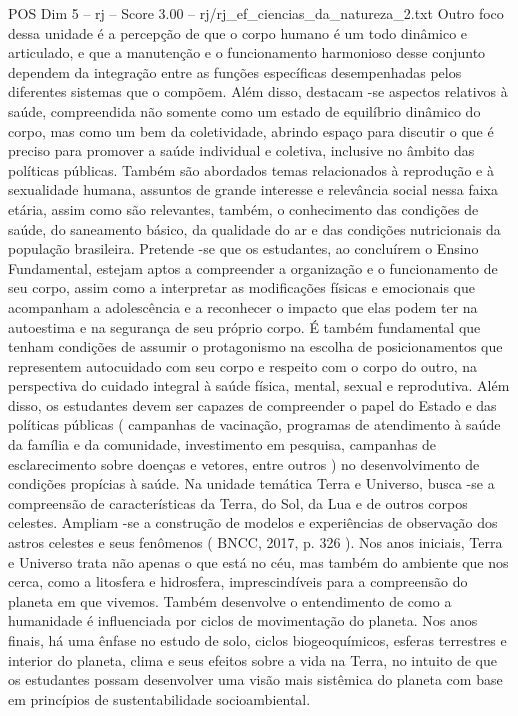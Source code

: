 \begin{textsample}{POS Dim 5 – rj – Score 3.00 – rj/rj\_ef\_ciencias\_da\_natureza\_2.txt}
Outro foco dessa unidade é a percepção de que o corpo humano é um todo dinâmico e articulado, e que a manutenção e o funcionamento harmonioso desse conjunto dependem da integração entre as funções específicas desempenhadas pelos diferentes sistemas que o compõem.
Além disso, destacam -se aspectos relativos à saúde, compreendida não somente como um estado de equilíbrio dinâmico do corpo, mas como um bem da coletividade, abrindo espaço para discutir o que é preciso para promover a saúde individual e coletiva, inclusive no âmbito das políticas públicas.
Também são abordados temas relacionados à reprodução e à sexualidade humana, assuntos de grande interesse e relevância social nessa faixa etária, assim como são relevantes, também, o conhecimento das condições de saúde, do saneamento básico, da qualidade do ar e das condições nutricionais da população brasileira.
Pretende -se que os estudantes, ao concluírem o Ensino Fundamental, estejam aptos a compreender a organização e o funcionamento de seu corpo, assim como a interpretar as modificações físicas e emocionais que acompanham a adolescência e a reconhecer o impacto que elas podem ter na autoestima e na segurança de seu próprio corpo.
É também fundamental que tenham condições de assumir o protagonismo na escolha de posicionamentos que representem autocuidado com seu corpo e respeito com o corpo do outro, na perspectiva do cuidado integral à saúde física, mental, sexual e reprodutiva.
Além disso, os estudantes devem ser capazes de compreender o papel do Estado e das políticas públicas ( campanhas de vacinação, programas de atendimento à saúde da família e da comunidade, investimento em pesquisa, campanhas de esclarecimento sobre doenças e vetores, entre outros ) no desenvolvimento de condições propícias à saúde.
Na unidade temática Terra e Universo, busca -se a compreensão de características da Terra, do Sol, da Lua e de outros corpos celestes.
Ampliam -se a construção de modelos e experiências de observação dos astros celestes e seus fenômenos ( BNCC, 2017, p. 326 ).
Nos anos iniciais, Terra e Universo trata não apenas o que está no céu, mas também do ambiente que nos cerca, como a litosfera e hidrosfera, imprescindíveis para a compreensão do planeta em que vivemos.
Também desenvolve o entendimento de como a humanidade é influenciada por ciclos de movimentação do planeta.
Nos anos finais, há uma ênfase no estudo de solo, ciclos biogeoquímicos, esferas terrestres e interior do planeta, clima e seus efeitos sobre a vida na Terra, no intuito de que os estudantes possam desenvolver uma visão mais sistêmica do planeta com base em princípios de sustentabilidade socioambiental.

\end{textsample}
